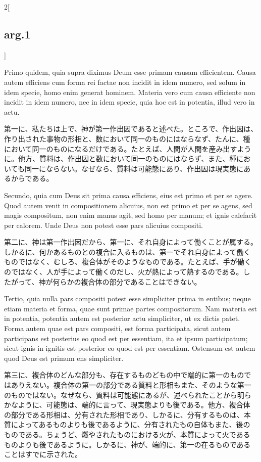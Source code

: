 \documentclass[paper=a4paper,fontsize=10pt,jafontsize=9pt,titlepage]{jlreq}
\begin{document}
\begin{paracol}{2}[\subsection{arg.1}]
\switchcolumn*

Primo quidem, quia supra diximus Deum esse primam causam
efficientem. Causa autem efficiens cum forma rei factae non incidit in
idem numero, sed solum in idem specie, homo enim generat
hominem. Materia vero cum causa efficiente non incidit in idem numero,
nec in idem specie, quia hoc est in potentia, illud vero in actu.

\switchcolumn

第一に、私たちは上で、神が第一作出因であると述べた。ところで、作出因は、
作り出された事物の形相と、数において同一のものにはならなず、たんに、種
において同一のものになるだけである。たとえば、人間が人間を産み出すよう
に。他方、質料は、作出因と数において同一のものにはならず、また、種にお
いても同一にならない。なぜなら、質料は可能態にあり、作出因は現実態にあ
るからである。

\switchcolumn*

Secundo, quia cum Deus sit prima causa efficiens, eius est primo et
per se agere. Quod autem venit in compositionem alicuius, non est
primo et per se agens, sed magis compositum, non enim manus agit, sed
homo per manum; et ignis calefacit per calorem. Unde Deus non potest
esse pars alicuius compositi.

\switchcolumn

第二に、神は第一作出因だから、第一に、それ自身によって働くことが属する。
しかるに、何かあるものとの複合に入るものは、第一でそれ自身によって働く
ものではなく、むしろ、複合体がそのようなものである。たとえば、手が働く
のではなく、人が手によって働くのだし、火が熱によって熱するのである。し
たがって、神が何らかの複合体の部分であることはできない。

\switchcolumn*

Tertio, quia nulla pars compositi potest esse simpliciter prima in
entibus; neque etiam materia et forma, quae sunt primae partes
compositorum. Nam materia est in potentia, potentia autem est
posterior actu simpliciter, ut ex dictis patet. Forma autem quae est
pars compositi, est forma participata, sicut autem participans est
posterius eo quod est per essentiam, ita et ipsum participatum; sicut
ignis in ignitis est posterior eo quod est per essentiam. Ostensum est
autem quod Deus est primum ens simpliciter.

\switchcolumn

第三に、複合体のどんな部分も、存在するものどもの中で端的に第一のもので
はありえない。複合体の第一の部分である質料と形相もまた、そのような第一
のものではない。なぜなら、質料は可能態にあるが、述べられたことから明ら
かなように、可能態は、端的に言って、現実態よりも後である。他方、複合体
の部分である形相は、分有された形相であり、しかるに、分有するものは、本
質によってあるものよりも後であるように、分有されたもの自体もまた、後の
ものである。ちょうど、燃やされたものにおける火が、本質によって火である
ものよりも後であるように。しかるに、神が、端的に、第一の在るものである
ことはすでに示された。


\end{paracol}
\end{document}
